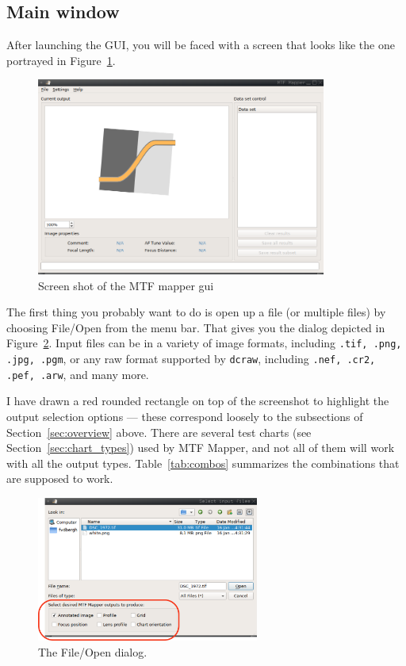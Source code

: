 \documentclass[a4paper]{article}
\begin{document}
\subsection{Main window}
After launching the GUI, you will be faced with a screen that looks like the
one portrayed in Figure~\ref{fig:sshot1}.

\begin{figure}[hb!]
\centering
\includegraphics[width=0.85\textwidth]{figures/sshot1}
\caption{Screen shot of the MTF mapper gui}
\label{fig:sshot1}
\end{figure}


The first thing you probably want to do is open up a file (or multiple
files) by choosing \textsf{File/Open} from the menu bar. That gives you the
dialog depicted in Figure~\ref{fig:file_dialog}. Input files can be in a variety 
of image formats, including \texttt{.tif, .png, .jpg, .pgm}, 
or any raw format supported by \verb+dcraw+, including 
\texttt{.nef, .cr2, .pef, .arw}, and many more.

\newpage

I have drawn a red rounded rectangle on top of the screenshot to highlight
the output selection options --- these correspond loosely to the subsections
of Section~\ref{sec:overview} above.  There are several test charts (see
Section~\ref{sec:chart_types}) used by MTF Mapper, and not all of them will
work with all the output types.  Table~\ref{tab:combos} summarizes the
combinations that are supposed to work.

\begin{figure}[ht!]
\centering
\includegraphics[width=0.65\textwidth]{figures/file_dialog2}
\caption{The File/Open dialog.}
\label{fig:file_dialog}
\end{figure}
\end{document}
